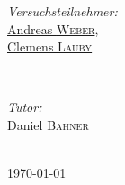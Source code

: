\documentclass[11pt,a4paper]{article}
\begin{document}
\begin{titlepage}
\mbox{}
\vfill
\begin{minipage}{0.4\textwidth}
\begin{flushleft} \large
\emph{Versuchsteilnehmer:}\\
\underline{Andreas \textsc{Weber}},\\ \underline{Clemens \textsc{Lauby}} %
\end{flushleft}
\end{minipage}
~
\begin{minipage}{0.4\textwidth}
\begin{flushright} \large
\emph{Tutor: } \\
Daniel \textsc{Bahner} %
\end{flushright}
\end{minipage}\\[1cm]



{\large \today}\\ %




\vfill %
\end{titlepage}



\newpage
{}
\tableofcontents
\newpage
{}
\end{document}
